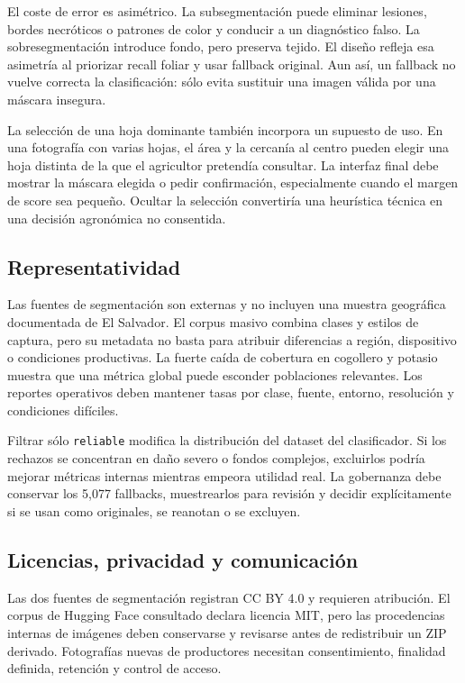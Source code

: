 \documentclass[11pt,a4paper]{article}
\begin{document}
El coste de error es asimétrico. La subsegmentación puede eliminar lesiones, bordes necróticos o patrones de color y conducir a un diagnóstico falso. La sobresegmentación introduce fondo, pero preserva tejido. El diseño refleja esa asimetría al priorizar recall foliar y usar fallback original. Aun así, un fallback no vuelve correcta la clasificación: sólo evita sustituir una imagen válida por una máscara insegura.


La selección de una hoja dominante también incorpora un supuesto de uso. En una fotografía con varias hojas, el área y la cercanía al centro pueden elegir una hoja distinta de la que el agricultor pretendía consultar. La interfaz final debe mostrar la máscara elegida o pedir confirmación, especialmente cuando el margen de score sea pequeño. Ocultar la selección convertiría una heurística técnica en una decisión agronómica no consentida.


\subsection{Representatividad}

Las fuentes de segmentación son externas y no incluyen una muestra geográfica documentada de El Salvador. El corpus masivo combina clases y estilos de captura, pero su metadata no basta para atribuir diferencias a región, dispositivo o condiciones productivas. La fuerte caída de cobertura en cogollero y potasio muestra que una métrica global puede esconder poblaciones relevantes. Los reportes operativos deben mantener tasas por clase, fuente, entorno, resolución y condiciones difíciles.


Filtrar sólo \texttt{reliable} modifica la distribución del dataset del clasificador. Si los rechazos se concentran en daño severo o fondos complejos, excluirlos podría mejorar métricas internas mientras empeora utilidad real. La gobernanza debe conservar los 5,077 fallbacks, muestrearlos para revisión y decidir explícitamente si se usan como originales, se reanotan o se excluyen.


\subsection{Licencias, privacidad y comunicación}

Las dos fuentes de segmentación registran CC BY 4.0 y requieren atribución. El corpus de Hugging Face consultado declara licencia MIT, pero las procedencias internas de imágenes deben conservarse y revisarse antes de redistribuir un ZIP derivado. Fotografías nuevas de productores necesitan consentimiento, finalidad definida, retención y control de acceso.
\end{document}
